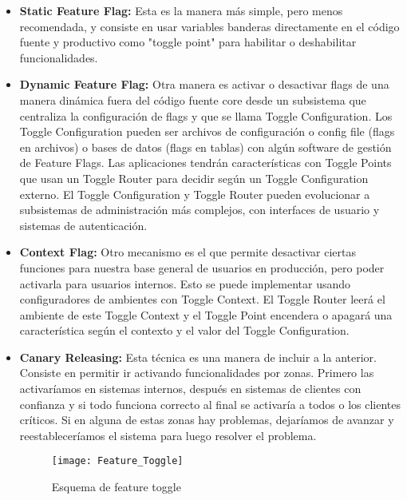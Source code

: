 \begin{itemize}

\item \textbf{Static Feature Flag:} Esta es la manera más simple, pero menos recomendada, y consiste en usar variables banderas directamente en el código fuente y productivo como "toggle point" para habilitar o deshabilitar funcionalidades.

\item \textbf{Dynamic Feature Flag:} Otra manera es activar o desactivar flags de una manera dinámica fuera del código fuente core desde un subsistema que centraliza la configuración de flags y que se llama Toggle Configuration. Los  Toggle Configuration pueden ser archivos de configuración o config file (flags en archivos) o bases de datos (flags en tablas) con algún software de gestión de Feature Flags. Las aplicaciones tendrán características con Toggle Points que usan un Toggle Router para decidir según un Toggle Configuration externo. El Toggle Configuration y Toggle Router pueden evolucionar a subsistemas de administración más complejos, con interfaces de usuario y sistemas de autenticación.

\item \textbf{Context Flag:} Otro mecanismo es el que permite desactivar ciertas funciones para nuestra base general de usuarios en producción, pero poder activarla para usuarios internos. Esto se puede implementar usando configuradores de ambientes con Toggle Context. El Toggle Router leerá el ambiente de este Toggle Context y el Toggle Point encendera o apagará una característica según el contexto y el valor del Toggle Configuration.

\item \textbf{Canary Releasing:} Esta técnica es una manera de incluir a la anterior. Consiste en permitir ir activando funcionalidades por zonas. Primero las activaríamos en sistemas internos, después en sistemas de clientes con confianza y si todo funciona correcto al final se activaría a todos o los clientes críticos. Si en alguna de estas zonas hay problemas, dejaríamos de avanzar y reestableceríamos el sistema para luego resolver el problema.

\begin{figure}[h]
  \centering
  \texttt{[image: Feature\_Toggle]}
  \caption{Esquema de feature toggle}
  \centering
  \label{fig:Feature_Toggle} %
\end{figure}
\FloatBarrier %


\end{itemize}

